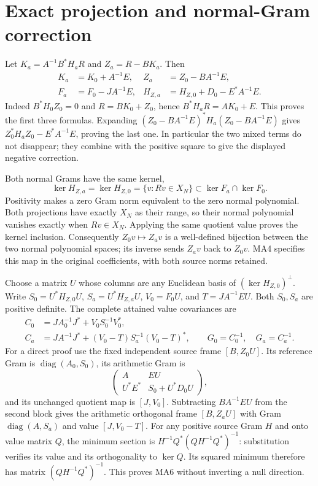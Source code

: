 \documentclass[11pt]{article}
\begin{document}
\section{Exact projection and normal-Gram correction}
Let $K_a=A^{-1}B^*H_aR$ and $Z_a=R-BK_a$. Then
\begin{equation}\tag{MA4}\boxed{\begin{aligned}
 K_a&=K_0+A^{-1}E,& Z_a&=Z_0-BA^{-1}E,\\
 F_a&=F_0-JA^{-1}E,&
 H_{Z,a}&=H_{Z,0}+D_0-E^*A^{-1}E.
\end{aligned}}\end{equation}
Indeed $B^*H_0Z_0=0$ and $R=BK_0+Z_0$, hence
$B^*H_aR=AK_0+E$. This proves the first three formulas.
Expanding $(Z_0-BA^{-1}E)^*H_a(Z_0-BA^{-1}E)$ gives
$Z_0^*H_aZ_0-E^*A^{-1}E$, proving the last one. In particular the
two mixed terms do not disappear; they combine with the positive
square to give the displayed negative correction.

Both normal Grams have the same kernel,
\[
 \ker H_{Z,a}=\ker H_{Z,0}=\{v:Rv\in X_N\}
 \subset\ker F_a\cap\ker F_0.
 \tag{MA5}
\]
Positivity makes a zero Gram norm equivalent to the zero normal
polynomial. Both projections have exactly $X_N$ as their range, so
their normal polynomial vanishes exactly when $Rv\in X_N$.
Applying the same quotient value proves the kernel inclusion.
Consequently $Z_0v\mapsto Z_av$ is a well-defined bijection between
the two normal polynomial spaces; its inverse sends $Z_av$ back to
$Z_0v$. MA4 specifies this map in the original coefficients, with
both source norms retained.

Choose a matrix $U$ whose columns are any Euclidean basis of
$(\ker H_{Z,0})^\perp$. Write
$S_0=U^*H_{Z,0}U$, $S_a=U^*H_{Z,a}U$,
$V_0=F_0U$, and $T=JA^{-1}EU$. Both $S_0,S_a$ are positive
definite. The complete attained value covariances are
\begin{equation}\tag{MA6}\begin{aligned}
 C_0&=JA_0^{-1}J^*+V_0S_0^{-1}V_0^*,\\
 C_a&=JA^{-1}J^*+(V_0-T)S_a^{-1}(V_0-T)^*,\qquad
 G_0=C_0^{-1},\quad G_a=C_a^{-1}.
\end{aligned}\end{equation}
For a direct proof use the fixed independent source frame
$[B,Z_0U]$. Its reference Gram is $\operatorname{diag}(A_0,S_0)$,
its arithmetic Gram is
\[
 \begin{pmatrix}A&EU\\U^*E^*&S_0+U^*D_0U\end{pmatrix},
\]
and its unchanged quotient map is $[J,V_0]$.
Subtracting $BA^{-1}EU$ from the second block gives the arithmetic
orthogonal frame $[B,Z_aU]$ with Gram
$\operatorname{diag}(A,S_a)$ and value $[J,V_0-T]$.
For any positive source Gram $H$ and onto value matrix $Q$, the
minimum section is $H^{-1}Q^*(QH^{-1}Q^*)^{-1}$: substitution verifies
its value and its orthogonality to $\ker Q$. Its squared minimum
therefore has matrix $(QH^{-1}Q^*)^{-1}$. This proves MA6 without
inverting a null direction.
\end{document}
